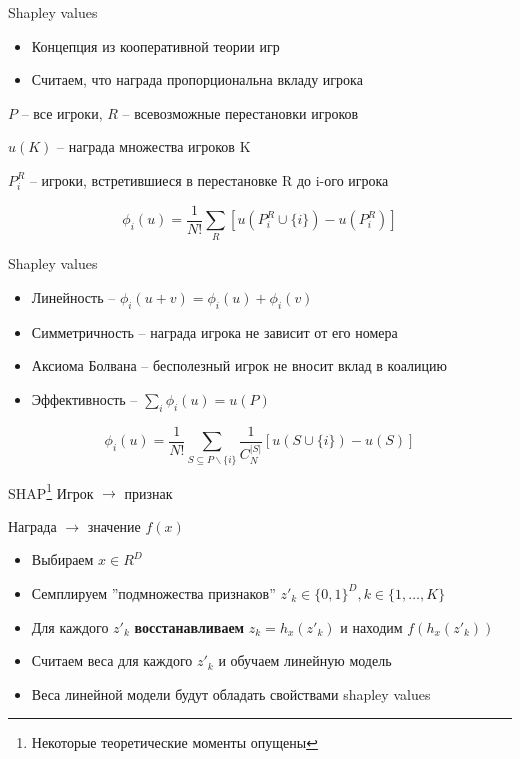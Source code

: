\documentclass[fleqn, xcolor=x11names]{beamer}
\begin{document}
\begin{frame}{Shapley values}
    \begin{itemize}
        \item Концепция из кооперативной теории игр
        \item Считаем, что награда пропорциональна вкладу игрока 
    \end{itemize}

    \vspace{10pt}

    $P$ -- все игроки, $R$ -- всевозможные перестановки игроков

    $u(K)$ -- награда множества игроков K

    $P_i^R$ -- игроки, встретившиеся в перестановке R до i-ого игрока

    $$\phi_i(u) = \frac{1}{N!}\sum\limits_{R}\left[u(P_i^R \cup \{i\}) - u(P_i^R)\right]$$
\end{frame}

\begin{frame}{Shapley values}
    \begin{itemize}
        \item Линейность -- $\phi_i(u+v) = \phi_i(u) + \phi_i(v)$
        \item Симметричность -- награда игрока не зависит от его номера
        \item Аксиома Болвана -- бесполезный игрок не вносит вклад в коалицию
        \item Эффективность -- $\sum\limits_i\phi_i(u) = u(P)$
    \end{itemize}
    $$\phi_i(u) = \frac{1}{N!}\sum\limits_{S \subseteq  P \backslash \{i\}}\frac{1}{C_{N}^{|S|}}\left[u(S \cup \{i\}) - u(S)\right]$$
\end{frame}

\begin{frame}{SHAP\footnote{Некоторые теоретические моменты опущены}}
    Игрок $\rightarrow$ признак

    Награда $\rightarrow$ значение $f(x)$

    \vspace{10pt}

    \begin{itemize}
        \item Выбираем $x \in R^D$
        \item Семплируем ''подмножества признаков'' $z'_{k} \in \{0,1\}^D, k \in \{1,\dots,K\}$
        \item Для каждого $z'_{k}$ \textbf{восстанавливаем} $z_k = h_x(z'_k)$ и находим $f(h_x(z'_k))$
        \item Считаем веса для каждого $z'_{k}$ и обучаем линейную модель
        \item Веса линейной модели будут обладать свойствами shapley values
    \end{itemize}

\end{frame}
\end{document}
